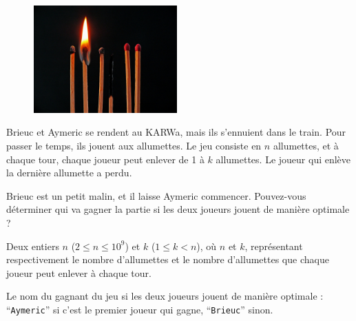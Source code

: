 \problemname{\problemyamlname}


\begin{figure}
	\centering
	\includegraphics[width=5.5cm]{allumettes.jpg}
\end{figure}
Brieuc et Aymeric se rendent au KARWa, mais ils s'ennuient dans le train. Pour passer le temps, ils jouent aux allumettes. Le jeu consiste en $n$ allumettes,
et à chaque tour, chaque joueur peut enlever de 1 à $k$ allumettes. Le joueur qui enlève la dernière allumette a perdu.

Brieuc est un petit malin, et il laisse Aymeric commencer. Pouvez-vous déterminer qui va gagner la partie si les deux joueurs jouent de manière optimale ?

\begin{Input}
	Deux entiers $n$ ($2 \le n \le 10^9$) et $k$ ($1 \le k < n$), où $n$ et $k$, représentant respectivement le nombre d'allumettes et le nombre d'allumettes que chaque joueur peut enlever à chaque tour.
\end{Input}

\begin{Output}
	Le nom du gagnant du jeu si les deux joueurs jouent de manière optimale : ``\verb|Aymeric|'' si c'est le premier joueur qui gagne, ``\verb|Brieuc|'' sinon.
\end{Output}
